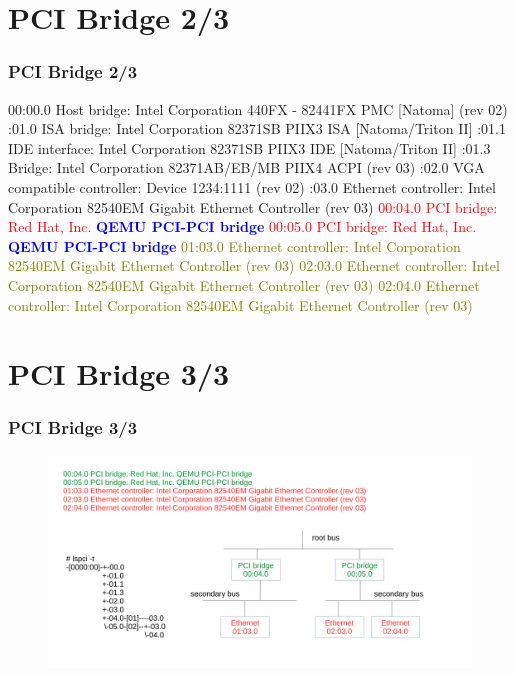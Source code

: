 \documentclass[aspectratio=169]{beamer}
\begin{document}
\section{PCI Bridge 2/3}
\begin{frame}
\frametitle{PCI Bridge 2/3}
\begin{block}{}
00:00.0 Host bridge: Intel Corporation 440FX - 82441FX PMC [Natoma] (rev 02) :01.0 ISA bridge: Intel Corporation 82371SB PIIX3 ISA [Natoma/Triton II] :01.1 IDE interface: Intel Corporation 82371SB PIIX3 IDE [Natoma/Triton II] :01.3 Bridge: Intel Corporation 82371AB/EB/MB PIIX4 ACPI (rev 03) :02.0 VGA compatible controller: Device 1234:1111 (rev 02) :03.0 Ethernet controller: Intel Corporation 82540EM Gigabit Ethernet Controller (rev 03) \newline
\textcolor{red}{00:04.0 PCI bridge: Red Hat, Inc. \textbf{\textcolor{blue}{QEMU PCI-PCI bridge}}} \newline
\textcolor{red}{00:05.0 PCI bridge: Red Hat, Inc. \textbf{\textcolor{blue}{QEMU PCI-PCI bridge}}} \newline
\textcolor{olive}{01:03.0 Ethernet controller: Intel Corporation 82540EM Gigabit Ethernet Controller (rev 03)} \newline
\textcolor{olive}{02:03.0 Ethernet controller: Intel Corporation 82540EM Gigabit Ethernet Controller (rev 03)} \newline
\textcolor{olive}{02:04.0 Ethernet controller: Intel Corporation 82540EM Gigabit Ethernet Controller (rev 03)}
\end{block}
\end{frame}


\section{PCI Bridge 3/3}
\begin{frame}
\frametitle{PCI Bridge 3/3}
\begin{figure}
\includegraphics[width=1.0\linewidth]{figures/pci-secondary.pdf}
\end{figure}
\end{frame}
\end{document}
